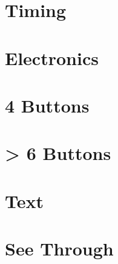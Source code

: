 \documentclass[article,colorback,accentcolor=tud3c]{report}
\begin{document}


 

\section{Timing}
 

\section{Electronics}
 
 
 
 
 

\section{4 Buttons}
 
 
 
 
 
 

\section{> 6 Buttons}
 
 
 
 
 
 

\section{Text}
 
 
 
 
 

\section{See Through}
 
 
 
 
 
 
 
\end{document}
